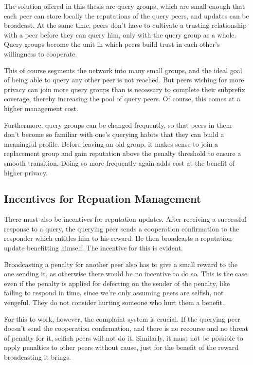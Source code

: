 The solution offered in this thesis are query groups, which are small enough
that each peer can store locally the reputations of the query peers, and updates
can be broadcast. At the same time, peers don't have to cultivate a trusting
relationship with a peer before they can query him, only with the query group as
a whole. Query groups become the unit in which peers build trust in each other's
willingness to cooperate.

This of course segments the network into many small groups, and the ideal goal
of being able to query any other peer is not reached. But peers wishing for more
privacy can join more query groups than is necessary to complete their subprefix
coverage, thereby increasing the pool of query peers. Of course, this comes at a
higher management cost.

Furthermore, query groups can be changed frequently, so that peers in them don't
become so familiar with one's querying habits that they can build a meaningful
profile. Before leaving an old group, it makes sense to join a replacement group
and gain reputation above the penalty threshold to ensure a smooth transition.
Doing so more frequently again adds cost at the benefit of higher privacy.

\subsection{Incentives for Repuation Management}
\label{sec:desc_incentives_rep_mgmt}
There must also be incentives for reputation updates. After receiving a
successful response to a query, the querying peer sends a cooperation
confirmation to the responder which entitles him to his reward. He then
broadcasts a reputation update benefitting himself. The incentive for this is
evident.

Broadcasting a penalty for another peer also has to give a small reward to the
one sending it, as otherwise there would be no incentive to do so. This is the
case even if the penalty is applied for defecting on the sender of the penalty,
like failing to respond in time, since we're only assuming peers are selfish,
not vengeful. They do not consider hurting someone who hurt them a benefit.

For this to work, however, the complaint system is crucial. If the querying peer
doesn't send the cooperation confirmation, and there is no recourse and no
threat of penalty for it, selfish peers will not do it.  Similarly, it must not
be possible to apply penalties to other peers without cause, just for the
benefit of the reward broadcasting it brings.

